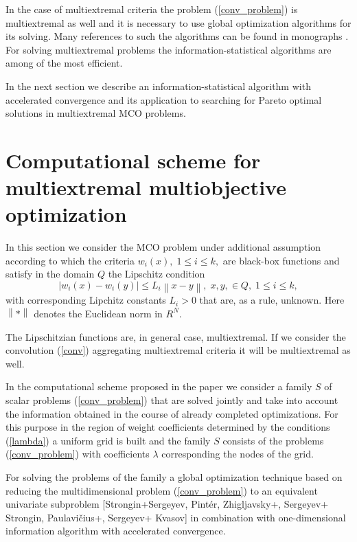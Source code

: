 \documentclass[]{interact}
\theoremstyle{plain}%
\theoremstyle{definition}
\theoremstyle{remark}
\begin{document}
In the case of multiextremal criteria the problem (\ref{conv_problem}) is multiextremal as well and it is necessary to use global optimization algorithms for its solving. Many references to such the algorithms can be found in monographs \cite{Strongin2000,Pinter1996,Zhigljavsky2008,Sergeyev2013,PaulaviciusZilinskas2014,Sergeyev2017}. For solving multiextremal problems the information-statistical algorithms \cite{Strongin2000,Sergeyev2013} are among of the most efficient.

In the next section we describe an information-statistical algorithm with accelerated convergence and its application to searching for Pareto optimal solutions in multiextremal MCO problems.

\section{Computational scheme for multiextremal multiobjective optimization}

In this section we consider the MCO problem under additional assumption according to which the criteria $w_i(x), \; 1 \leq i \leq k,$ are black-box functions and satisfy in the domain $Q$ the Lipschitz condition
\begin{equation}\label{lip}
\left| w_i(x) - w_i(y)\right| \leq L_i \left\| x-y \right\|, \; x,y, \in Q, \; 1 \leq i \leq k,
\end{equation}
with corresponding Lipchitz constants $L_i > 0$ that are, as a rule, unknown. Here $\left\|*\right\|$   denotes the Euclidean norm in $R^N$.

The Lipschitzian functions are, in general case, multiextremal. If we consider the convolution (\ref{conv}) aggregating multiextremal criteria it will be multiextremal as well.

In the computational scheme proposed in the paper we consider a family $S$ of scalar problems (\ref{conv_problem}) that are solved jointly and take into account the information obtained in the course of already completed optimizations. For this purpose in the region of weight coefficients determined by the conditions (\ref{lambda}) a uniform grid is built and the family $S$ consists of the problems (\ref{conv_problem}) with coefficients $\lambda$ corresponding the nodes of the grid.

For solving the problems of the family a global optimization technique based on reducing the multidimensional problem (\ref{conv_problem}) to an equivalent univariate subproblem [Strongin+Sergeyev, Pintér, Zhigljavsky+, Sergeyev+ Strongin, Paulavičius+, Sergeyev+ Kvasov]  in combination with one-dimensional information algorithm with accelerated convergence.
\end{document}
